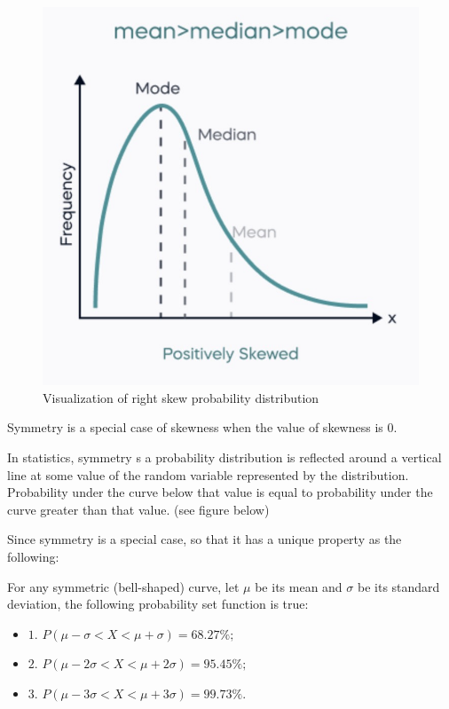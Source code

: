 \begin{figure}[H]
 \centering
 \includegraphics[scale=0.45]{Section1/img/Rightskew.jpg}
 \caption{Visualization of right skew probability distribution}
\end{figure}

\noindent
Symmetry is a special case of skewness when the value of skewness is $0$.

\begin{definition}[Symmetry]
In statistics, symmetry s a probability distribution is reflected around a vertical line at some value of the random variable represented by the distribution. Probability under the curve below that value is equal to probability under the curve greater than that value. (see figure below)
\end{definition}

\noindent
Since symmetry is a special case, so that it has a unique property as the following:

\begin{theorem}
For any symmetric (bell-shaped) curve, let $\mu$ be its mean and $\sigma$ be its standard deviation, the following probability set function is true:
   \begin{itemize}
    \item  $1.$ $P(\mu - \sigma < X < \mu + \sigma) = 68.27\%;$
    \item  $2.$ $P(\mu - 2\sigma < X < \mu + 2\sigma) = 95.45\%;$
    \item  $3.$ $P(\mu - 3\sigma < X < \mu + 3\sigma) = 99.73\%.$
   \end{itemize}
\end{theorem}

